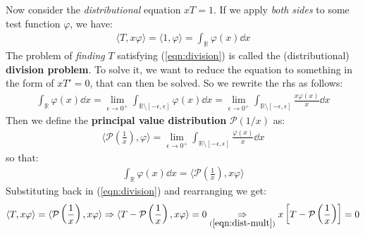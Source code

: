 \documentclass[../template.tex]{subfiles}
\begin{document}
\begin{expl}
Now consider the \textit{distributional} equation $x T =1$. If we apply \textit{both sides} to some test function $\varphi$, we have:
\begin{align} \label{eqn:division}
    \langle T, x \varphi \rangle = \langle 1, \varphi \rangle = \int_{\mathbb{R}} \varphi(x) \dd{x}
\end{align}  
The problem of \textit{finding} $T$ satisfying (\ref{eqn:division}) is called the (distributional) \textbf{division problem}. To solve it, we want to reduce the equation to something in the form of $x T' = 0$, that can then be solved. So we rewrite the rhs as follows:
\begin{align*}
    \int_{\mathbb{R}} \varphi(x) \dd{x} = \lim_{\epsilon \to 0^+} \int_{\mathbb{R} \setminus [-\epsilon, \epsilon]} \varphi(x) \dd{x} = \lim_{\epsilon \to 0^+} \int_{\mathbb{R}\setminus [-\epsilon, \epsilon]} \frac{x \varphi(x)}{x} \dd{x}
\end{align*}
Then we define the \textbf{principal value distribution} $\mathcal{P}(1/x)$ as:
\begin{align*}
    \langle \mathcal{P}\left(\frac{1}{x} \right), \varphi\rangle = \lim_{\epsilon \to 0^+} \int_{\mathbb{R} \setminus [-\epsilon, \epsilon]} \frac{\varphi(x)}{x} \dd{x} 
\end{align*} 
so that:
\begin{align*}
    \int_{\mathbb{R}}\varphi(x) \dd{x} = \langle \mathcal{P}\left(\frac{1}{x}\right), x\varphi \rangle
\end{align*}
Substituting back in (\ref{eqn:division}) and rearranging we get:
\begin{align*}
    \langle T, x \varphi \rangle = \langle \mathcal{P}\left(\frac{1}{x}\right), x\varphi \rangle \Rightarrow \langle T - \mathcal{P}\left(\frac{1}{x} \right), x \varphi \rangle = 0 \underset{(\ref{eqn:dist-mult})}{\Rightarrow}  
    x\left[T - \mathcal{P}\left(\frac{1}{x} \right)\right] = 0
\end{align*}
     
\end{expl}
\end{document}
